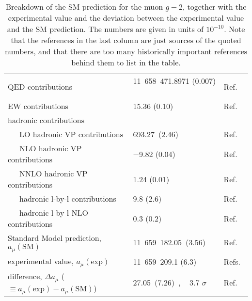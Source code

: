\begin{table*}[thbp]
\caption{Breakdown of the SM prediction for the muon $g-2$,
together with the experimental value
and the deviation between the experimental value and 
the SM prediction.  The numbers are given in units of $10^{-10}$.
Note that the references in the last column are just sources
of the quoted numbers, and that there are too many
historically important references behind them to list in the table.}
%
\label{table:a_mu_SM}
%
\begin{center} \begin{tabular}[t]{l|ll}
\hline
  QED contributions 
 & \phantom{$-$}11~658~471.8971 (0.007)
 ~\hspace*{0.2cm}~ & Ref.~\cite{Aoyama-etal-2017} \\
  EW contributions & \phantom{$-$00~000~0}15.36 (0.10)
 & Ref.~\cite{Gnendiger-etal} \\
  hadronic contributions &  &\\
~~~LO hadronic VP contributions  &
  \phantom{$-$00~000~}693.27~(2.46) & Ref.~\cite{KNT18}\\
  ~~~NLO hadronic VP contributions &
  \phantom{00~000~00}$-$9.82 (0.04) &  Ref.~\cite{KNT18} \\
  ~~~NNLO hadronic VP contributions & 
\phantom{$-$00~000~00}1.24 (0.01)  & Ref.~\cite{Kurz-etal-hadNNLO}\\
  ~~~hadronic l-by-l contributions & 
\phantom{$-$00~000~00}9.8 (2.6) &
 Ref.~\cite{Nyffeler-LbL} \\
  ~~~hadronic l-by-l NLO contributions & 
\phantom{$-$00~000~00}0.3 (0.2) &
 Ref.~\cite{Colangelo-etal-NLOLbL} \\
\hline \hline
  Standard Model prediction, $a_\mu(\text{SM})$& 
   \phantom{$-$}11~659~182.05~(3.56)   & Ref.~\cite{KNT18} \\
  experimental value, $a_\mu(\text{exp})$
 & \phantom{$-$}11~659~209.1 (6.3) & Refs.~\cite{PDG,Bennett:2006fi} \\
\hline \hline
 difference, $\Delta a_\mu$ 
 ($\equiv a_\mu(\text{exp}) - a_\mu(\text{SM})$) & 
\phantom{$-$0~000~00}27.05~(7.26)~, ~ 3.7 $\sigma$ & Ref.~\cite{KNT18} \\
\hline
\end{tabular} \end{center} \end{table*}




